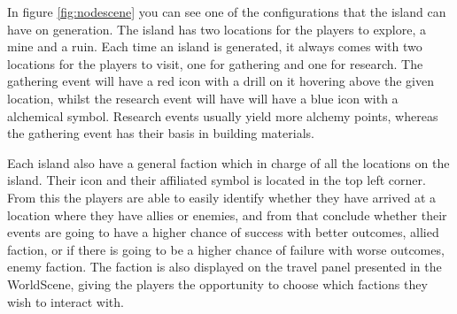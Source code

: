 In figure \ref{fig:nodescene} you can see one of the configurations that the island can have on generation. The island has two locations for the players to explore, a mine and a ruin. 
Each time an island is generated, it always comes with two locations for the players to visit, one for gathering and one for research. The gathering event will have a red icon with a drill on it hovering above the given location, whilst the research event will have will have a blue icon with a alchemical symbol.
Research events usually yield more alchemy points, whereas the gathering event has their basis in building materials.

Each island also have a general faction which in charge of all the locations on the island. Their icon and their affiliated symbol is located in the top left corner. From this the players are able to easily identify whether they have arrived at a location where they have allies or enemies, and from that conclude whether their events are going to have a higher chance of success with better outcomes, allied faction, or if there is going to be a higher chance of failure with worse outcomes, enemy faction.
The faction is also displayed on the travel panel presented in the WorldScene, giving the players the opportunity to choose which factions they wish to interact with.

